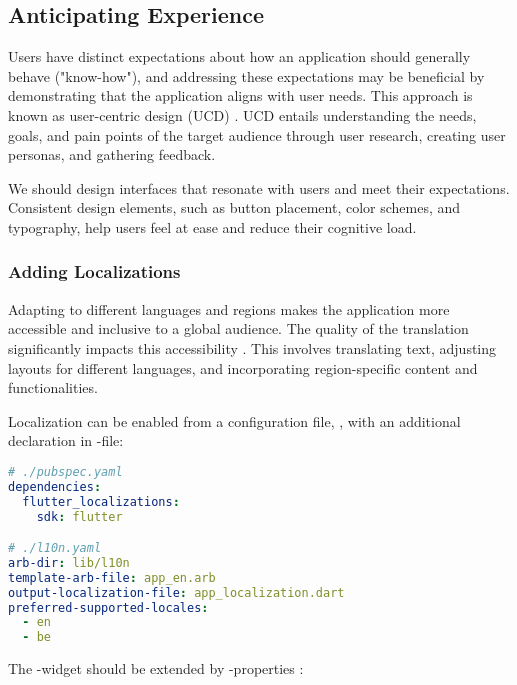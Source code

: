 
\subsection{Anticipating Experience}

Users have distinct expectations about how an application should generally behave ("know-how"), and addressing these 
expectations may be beneficial by demonstrating that the application aligns with user needs. This approach is known as 
user-centric design (UCD) \cite{Stil16}. UCD entails understanding the needs, goals, and pain points of the target 
audience through user research, creating user personas, and gathering feedback.

We should design interfaces that resonate with users and meet their expectations. Consistent design elements, such as 
button placement, color schemes, and typography, help users feel at ease and reduce their cognitive load.


\subsubsection{Adding Localizations} \label{locale}

Adapting to different languages and regions makes the application more accessible and inclusive to a global audience. 
The quality of the translation significantly impacts this accessibility \cite{Lomm07}. This involves translating text, 
adjusting layouts for different languages, and incorporating region-specific content and functionalities.

\noindent Localization can be enabled from a configuration file, , with an additional declaration in 
-file: 

\begin{lstlisting}[language=yaml]
# ./pubspec.yaml
dependencies:
  flutter_localizations:
    sdk: flutter

# ./l10n.yaml
arb-dir: lib/l10n
template-arb-file: app_en.arb
output-localization-file: app_localization.dart
preferred-supported-locales:
  - en
  - be
\end{lstlisting}

\noindent The -widget should be extended by -properties :

